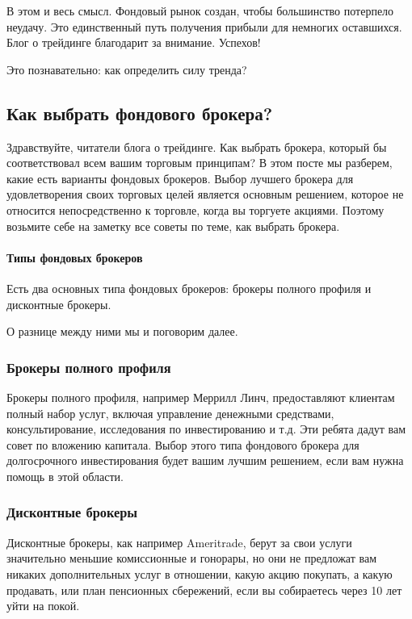 \documentclass[a5paper]{article}
\begin{document}
В этом и весь смысл. Фондовый рынок создан, чтобы большинство потерпело неудачу. Это единственный путь получения прибыли для немногих оставшихся. Блог о трейдинге благодарит за внимание. Успехов!


Это познавательно: как определить силу тренда?

\subsection{Как выбрать фондового брокера?}


Здравствуйте, читатели блога о трейдинге. Как выбрать брокера, который
бы соответствовал всем вашим торговым принципам? В этом посте мы
разберем, какие есть варианты фондовых брокеров. Выбор лучшего брокера
для удовлетворения своих торговых целей является основным решением,
которое не относится непосредственно к торговле, когда вы торгуете
акциями. Поэтому возьмите себе на заметку все советы по теме, как
выбрать брокера.

\paragraph{Типы фондовых брокеров}

Есть два основных типа фондовых брокеров: брокеры полного профиля и дисконтные брокеры.

О разнице между ними мы и поговорим далее.

\subsubsection{Брокеры полного профиля}

Брокеры полного профиля, например Меррилл Линч, предоставляют клиентам
полный набор услуг, включая управление денежными средствами,
консультирование, исследования по инвестированию и т.д. Эти ребята
дадут вам совет по вложению капитала. Выбор этого типа фондового
брокера для долгосрочного инвестирования будет вашим лучшим решением,
если вам нужна помощь в этой области.

\subsubsection{Дисконтные брокеры}

Дисконтные брокеры, как например Ameritrade, берут за свои услуги значительно меньшие комиссионные и гонорары, но они не предложат вам никаких дополнительных услуг в отношении, какую акцию покупать, а какую продавать, или план пенсионных сбережений, если вы собираетесь через 10 лет уйти на покой.
\end{document}

